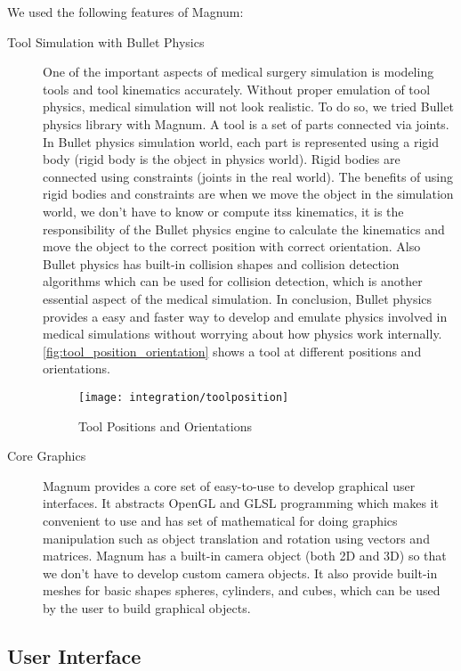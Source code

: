 We used the following features of Magnum:
\begin{description}
  \item [Tool Simulation with Bullet Physics] One of the important aspects of medical surgery simulation is modeling tools and tool kinematics accurately. Without proper emulation of tool physics, medical simulation will not look realistic. To do so, we tried Bullet physics library with Magnum. A tool is a set of parts connected via joints. In Bullet physics simulation world, each part is represented using a rigid body (rigid body is the object in physics world). Rigid bodies are connected using constraints (joints in the real world). The benefits of using rigid bodies and constraints are when we move the object in the simulation world, we don't have to know or compute itss kinematics, it is the responsibility of the Bullet physics engine to calculate the kinematics and move the object to the correct position with correct orientation. Also Bullet physics has built-in collision shapes and collision detection algorithms which can be used for collision detection, which is another essential aspect of the medical simulation. In conclusion, Bullet physics provides a easy and faster way to develop and emulate physics involved in medical simulations without worrying about how physics work internally. \autoref{fig:tool_position_orientation} shows a tool at different positions and orientations.

  \begin{figure}
    \centering
    \texttt{[image: integration/toolposition]}
    \caption{Tool Positions and Orientations}\label{fig:tool_position_orientation}
  \end{figure}

  \item [Core Graphics ] Magnum provides a core set of easy-to-use  to develop graphical user interfaces. It abstracts OpenGL and GLSL programming which makes it convenient to use and has set of mathematical  for doing graphics manipulation such as object translation and rotation using vectors and matrices. Magnum has a built-in camera object (both 2D and 3D) so that we don't have to develop custom camera objects. It also provide built-in meshes for basic shapes \ie spheres, cylinders, and cubes, which can be used by the user to build graphical objects.
\end{description}

\subsection{User Interface}\label{sec:ui}
